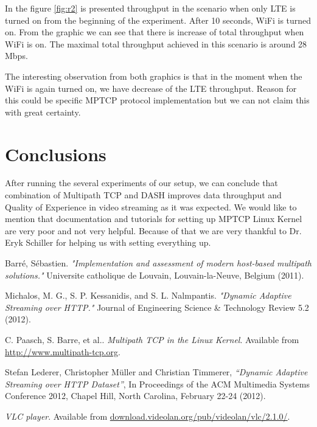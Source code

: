 \documentclass{llncs}
\begin{document}
In the figure \ref{fig:r2} is presented throughput in the scenario when only LTE is turned on from the beginning of the experiment. After 10 seconds, WiFi is turned on. From the graphic we can see that there is increase of total throughput when WiFi is on. The maximal total throughput achieved in this scenario is around 28 Mbps.

The interesting observation from both graphics is that in the moment when the WiFi is again turned on, we have decrease of the LTE throughput. Reason for this could be specific MPTCP protocol implementation but we can not claim this with great certainty.


\section{Conclusions}
After running the several experiments of our setup, we can conclude that combination of Multipath TCP and DASH improves data throughput and Quality of Experience in video streaming as it was expected. We would like to mention that documentation and tutorials for setting up MPTCP Linux Kernel \cite{linuxMPTCP} are very poor and not very helpful. Because of that we are very thankful to Dr. Eryk Schiller for helping us with setting everything up. 



\begin{thebibliography}{1}
Barré, Sébastien. \emph{"Implementation and assessment of modern host-based multipath solutions." } Universite catholique de Louvain, Louvain-la-Neuve, Belgium (2011).

Michalos, M. G., S. P. Kessanidis, and S. L. Nalmpantis. \emph{"Dynamic Adaptive Streaming over HTTP."} Journal of Engineering Science \& Technology Review 5.2 (2012).

C. Paasch, S. Barre, et al.. \emph{Multipath TCP in the Linux Kernel}. Available from \url{http://www.multipath-tcp.org}.

Stefan Lederer, Christopher Müller and Christian Timmerer, \emph{“Dynamic Adaptive Streaming over HTTP Dataset”}, In Proceedings of the ACM Multimedia Systems Conference 2012, Chapel Hill, North Carolina, February 22-24 (2012). 

\emph{VLC player}. Available from \url{download.videolan.org/pub/videolan/vlc/2.1.0/}.

\end{thebibliography}
\end{document}
